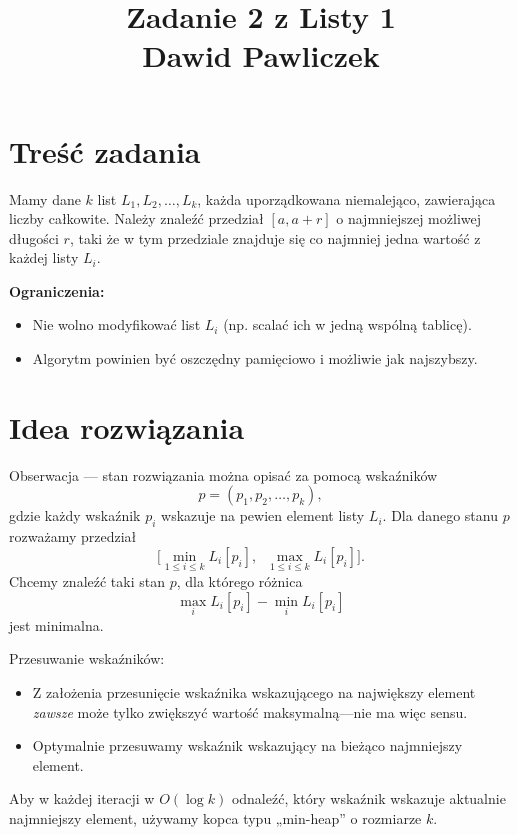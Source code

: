 \documentclass[a4paper,12pt]{article}
\title{Zadanie 2 z Listy 1 \\ \large{Dawid Pawliczek}}
\author{}
\date{}
\begin{document}
\maketitle

\section*{Treść zadania}
Mamy dane $k$ list $L_1, L_2, \dots, L_k$, każda uporządkowana niemalejąco, zawierająca liczby całkowite. 
Należy znaleźć przedział $[a, a + r]$ o najmniejszej możliwej długości $r$, taki że w tym przedziale znajduje się co najmniej jedna wartość z każdej listy $L_i$.

\medskip
\noindent \textbf{Ograniczenia:}
\begin{itemize}
  \item Nie wolno modyfikować list $L_i$ (np. scalać ich w jedną wspólną tablicę).
  \item Algorytm powinien być oszczędny pamięciowo i możliwie jak najszybszy.
\end{itemize}

\section*{Idea rozwiązania}
Obserwacja — stan rozwiązania można opisać za pomocą wskaźników
\[
  p = (p_1, p_2, \dots, p_k),
\]
gdzie każdy wskaźnik $p_i$ wskazuje na pewien element listy $L_i$. Dla danego stanu $p$ rozważamy przedział
\[
  \bigl[\min_{1 \le i \le k} L_i[p_i],\;\; \max_{1 \le i \le k} L_i[p_i]\bigr].
\]
Chcemy znaleźć taki stan $p$, dla którego różnica
\[
  \max_i L_i[p_i] - \min_i L_i[p_i]
\]
jest minimalna.

Przesuwanie wskaźników:
\begin{itemize}
  \item Z założenia przesunięcie wskaźnika wskazującego na największy element \emph{zawsze} może tylko zwiększyć wartość maksymalną—nie ma więc sensu.
  \item Optymalnie przesuwamy wskaźnik wskazujący na bieżąco najmniejszy element.
\end{itemize}

Aby w każdej iteracji w $O(\log k)$ odnaleźć, który wskaźnik wskazuje aktualnie najmniejszy element, używamy kopca typu „min-heap” o rozmiarze $k$.
\end{document}
